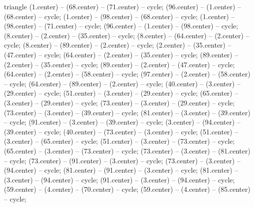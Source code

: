 \begin{pgfonlayer}{triangle}
 (1.center) -- (68.center) -- (71.center) -- cycle; 
 (96.center) -- (1.center) -- (68.center) -- cycle; 
 (1.center) -- (98.center) -- (68.center) -- cycle; 
 (1.center) -- (98.center) -- (71.center) -- cycle; 
 (96.center) -- (1.center) -- (98.center) -- cycle; 
 (8.center) -- (2.center) -- (35.center) -- cycle; 
 (8.center) -- (64.center) -- (2.center) -- cycle; 
 (8.center) -- (89.center) -- (2.center) -- cycle; 
 (2.center) -- (35.center) -- (47.center) -- cycle; 
 (64.center) -- (2.center) -- (35.center) -- cycle; 
 (89.center) -- (2.center) -- (35.center) -- cycle; 
 (89.center) -- (2.center) -- (47.center) -- cycle; 
 (64.center) -- (2.center) -- (58.center) -- cycle; 
 (97.center) -- (2.center) -- (58.center) -- cycle; 
 (64.center) -- (89.center) -- (2.center) -- cycle; 
 (40.center) -- (3.center) -- (29.center) -- cycle; 
 (51.center) -- (3.center) -- (29.center) -- cycle; 
 (65.center) -- (3.center) -- (29.center) -- cycle; 
 (73.center) -- (3.center) -- (29.center) -- cycle; 
 (73.center) -- (3.center) -- (39.center) -- cycle; 
 (81.center) -- (3.center) -- (39.center) -- cycle; 
 (91.center) -- (3.center) -- (39.center) -- cycle; 
 (3.center) -- (94.center) -- (39.center) -- cycle; 
 (40.center) -- (73.center) -- (3.center) -- cycle; 
 (51.center) -- (3.center) -- (65.center) -- cycle; 
 (51.center) -- (3.center) -- (73.center) -- cycle; 
 (65.center) -- (3.center) -- (73.center) -- cycle; 
 (73.center) -- (3.center) -- (81.center) -- cycle; 
 (73.center) -- (91.center) -- (3.center) -- cycle; 
 (73.center) -- (3.center) -- (94.center) -- cycle; 
 (81.center) -- (91.center) -- (3.center) -- cycle; 
 (81.center) -- (3.center) -- (94.center) -- cycle; 
 (91.center) -- (3.center) -- (94.center) -- cycle; 
 (59.center) -- (4.center) -- (70.center) -- cycle; 
 (59.center) -- (4.center) -- (85.center) -- cycle; 

\end{pgfonlayer}
